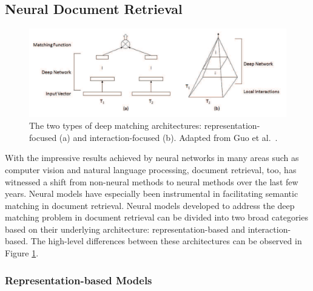 
\subsection{Neural Document Retrieval}
\label{neural-retrieval}

\begin{figure}[t!]
\centering
  \includegraphics[width=5in]{deep_matching.png}
\caption{The two types of deep matching architectures: representation-focused (a) and interaction-focused (b). Adapted from Guo et al.~\cite{guo2017drmm}.}
\label{fig:deep_matching}
\end{figure}

With the impressive results achieved by neural networks in many areas such as computer vision and natural language processing, document retrieval, too, has witnessed a shift from non-neural methods to neural methods over the last few years.
Neural models have especially been instrumental in facilitating semantic matching in document retrieval.
Neural models developed to address the deep matching problem in document retrieval can be divided into two broad categories based on their underlying architecture: representation-based and interaction-based.
The high-level differences between these architectures can be observed in Figure \ref{fig:deep_matching}.

\subsubsection{Representation-based Models}

